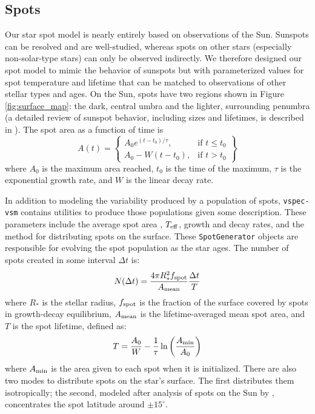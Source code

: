 \documentclass[twocolumn,linenumbers]{aastex631}
\newcommand{\teff}{$T_{\rm eff}$}
\begin{document}
\subsection{Spots \label{subsec:spots}}
Our star spot model is nearly entirely based on observations of the Sun. Sunspots can be resolved and are well-studied, whereas spots on other stars (especially non-solar-type stars) can only be observed indirectly. We therefore designed our spot model to mimic the behavior of sunspots but with parameterized values for spot temperature and lifetime that can be matched to observations of other stellar types and ages. On the Sun, spots have two regions shown in Figure \ref{fig:surface_map}: the dark, central umbra and the lighter, surrounding penumbra (a detailed review of sunspot behavior, including sizes and lifetimes, is described in \citet{solanki2003}). The spot area as a function of time is
\begin{equation}
    A(t) = \left\{
    \begin{array}{lr}
        A_0 e^{(t-t_0)/\tau}, & \text{if } t \leq t_0 \\
        A_0 - W(t-t_0), & \text{if } t > t_0
    \end{array}
    \right\}
\end{equation}
where $A_0$ is the maximum area reached, $t_0$ is the time of the maximum, $\tau$ is the exponential growth rate, and $W$ is the linear decay rate.

In addition to modeling the variability produced by a population of spots, \texttt{vspec-vsm} contains utilities to produce those populations given some description.
These parameters include the average spot area \citep[lognormally distributed, ][]{bogdan1988}, \teff, growth and decay rates, and the method for distributing spots on the surface. These \texttt{SpotGenerator} objects are responsible for evolving the spot population as the star ages. The number of spots created in some interval $\Delta t$ is:
\begin{equation}
    N(\Delta t) = \frac{4 \pi R_*^2 f_{\rm spot}}{A_{\rm mean}} \frac{\Delta t}{T}
\end{equation}
where $R_*$ is the stellar radius, $f_{\rm spot}$ is the fraction of the surface covered by spots in growth-decay equilibrium, $A_{\rm mean}$ is the lifetime-averaged mean spot area, and $T$ is the spot lifetime, defined as:
\begin{equation}
    T = \frac{A_0}{W} - \frac{1}{\tau} \ln{\left (\frac{A_{\rm min}}{A_0}\right )}
\end{equation}
where $A_{\rm min}$ is the area given to each spot when it is initialized. There are also two modes to distribute spots on the star's surface. The first distributes them isotropically; the second, modeled after analysis of spots on the Sun by \citet{mandal2017}, concentrates the spot latitude around $\pm 15^{\circ}$.
\end{document}
